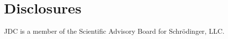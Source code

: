 \documentclass[9pt,lineno]{elife}
\begin{document}
\section{Disclosures}

JDC is a member of the Scientific Advisory Board for Schr\"{o}dinger, LLC.

\nocite{*} %


\end{document}
